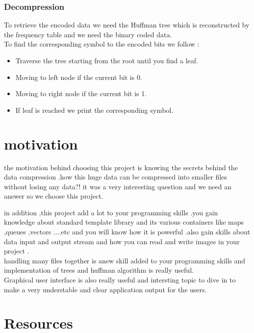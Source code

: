 \documentclass[14 pt,a4paper,double column]{article}
\begin{document}
\subsubsection{Decompression}
To retrieve the encoded data we need the Huffman tree which is reconstructed by the frequency table and we need the binary coded data.\\
To find the corresponding symbol to the encoded bits we follow :
\begin{itemize}
    \item Traverse the tree starting from the root until you find a leaf.
    \item Moving to left node if the current bit is 0.
    \item Moving to right node if the current bit is 1. 
    \item If leaf is reached we print the corresponding symbol.
\end{itemize}


\section{motivation} 
the motivation behind choosing this project is knowing the secrets behind the data compression .how this huge data can be compressed into smaller files without losing any data?! it was a very interesting question and we need an answer so we choose this project.

in addition ,this project add a lot to your programming skills .you gain knowledge about standard template library and its various containers like maps ,queues  ,vectors ....etc and you will know how it is powerful .also gain skills about data input and output stream and how you can read and write images in your project .\\
handling many files together is anew skill added to your programming skills and implementation of trees and huffman algorithm is really useful.\\
Graphical user interface is also really useful and intersting topic to dive in to make a very understable and clear application output for the users.
\section{Resources}
\end{document}
